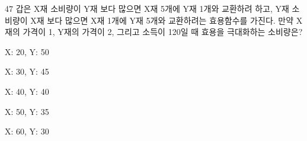 \begin{question}{47}
갑은 X재 소비량이 Y재 보다 많으면 X재 5개에 Y재 1개와 교환하려 하고, Y재 소비량이 X재 보다 많으면 X재 1개에 Y재 5개와 교환하려는 효용함수를 가진다. 만약 X재의 가격이 1, Y재의 가격이 2, 그리고 소득이 120일 때 효용을 극대화하는 소비량은?
\begin{choices}
  \item X: 20, Y: 50
  \item X: 30, Y: 45
  \item X: 40, Y: 40
  \item X: 50, Y: 35
  \item X: 60, Y: 30
\end{choices}
\end{question}
